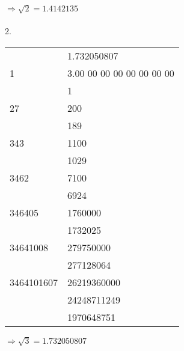 \documentclass[a4paper,10pt]{article}
\begin{document}
$\Rightarrow \sqrt{2} = 1.4142135$\\\\
2.\\
\begin{center}
\begin{tabular}{l|l } 
 
       & 1.732050807\\\cline{2-2}
1      &3.00 00 00 00 00 00 00 00 \\
       & 1 \\\cline{2-2} 
27     & 200\\ 
       &{\hspace{2mm}189}\\\cline{2-2} 
343     &{\hspace{4mm}1100}\\
       &{\hspace{4mm}1029}\\\cline{2-2}
3462   &{\hspace{8mm}7100}\\
       &{\hspace{8mm}6924}\\\cline{2-2} 
346405  &{\hspace{8mm}1760000}\\ 
       &{\hspace{8mm}1732025}\\\cline{2-2} 
34641008 &{\hspace{12mm}279750000}\\ 
       &{\hspace{12mm}277128064}\\\cline{2-2}
3464101607&{\hspace{16mm}26219360000}\\ 
       &{\hspace{16mm}24248711249}\\\cline{2-2}
       &{\hspace{18mm}1970648751}\\
                                   
\end{tabular}
\end{center}
$\Rightarrow \sqrt{3} = 1.732050807$
\end{document}

